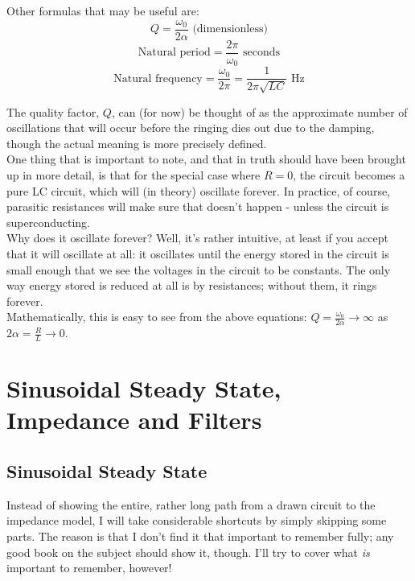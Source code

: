 \documentclass[12pt,a4paper]{report}
\begin{document}
Other formulas that may be useful are:
\[ Q = \frac{\omega_0}{2\alpha} \text{ (dimensionless)} \]
\[ \text{Natural period} = \frac{2\pi}{\omega_0} \text{ seconds} \]
\[ \text{Natural frequency} = \frac{\omega_0}{2\pi} = \frac{1}{2\pi \sqrt{LC}} \text{ Hz} \]

The quality factor, $Q$, can (for now) be thought of as the approximate number of oscillations that will occur before the ringing dies out due to the damping, though the actual meaning is more precisely defined.\\

One thing that is important to note, and that in truth should have been brought up in more detail, is that for the special case where $R = 0$, the circuit becomes a pure LC circuit, which will (in theory) oscillate forever. In practice, of course, parasitic resistances will make sure that doesn't happen - unless the circuit is superconducting.\\
Why does it oscillate forever? Well, it's rather intuitive, at least if you accept that it will oscillate at all: it oscillates until the energy stored in the circuit is small enough that we see the voltages in the circuit to be constants. The only way energy stored is reduced at all is by resistances; without them, it rings forever.\\

Mathematically, this is easy to see from the above equations: $\displaystyle Q = \frac{\omega_0}{2\alpha} \to \infty$ as $2\displaystyle \alpha = \frac{R}{L} \to 0$.


\chapter{Sinusoidal Steady State, Impedance and Filters}
\section{Sinusoidal Steady State}
Instead of showing the entire, rather long path from a drawn circuit to the impedance model, I will take considerable shortcuts by simply skipping some parts. The reason is that I don't find it that important to remember fully; any good book on the subject should show it, though. I'll try to cover what \emph{is} important to remember, however!\\
\end{document}
